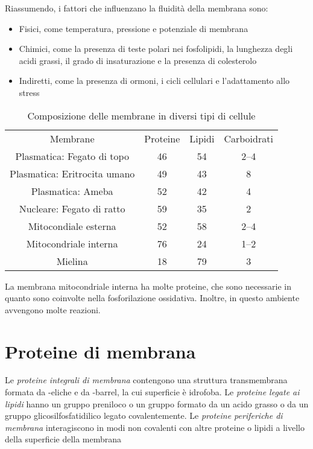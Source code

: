 Riassumendo, i fattori che influenzano la fluidità della membrana sono:
\begin{itemize}
\item Fisici, come temperatura, pressione e potenziale di membrana
\item Chimici, come la presenza di teste polari nei fosfolipidi, la lunghezza degli acidi grassi, il grado di insaturazione e la presenza di colesterolo
\item Indiretti, come la presenza di ormoni, i cicli cellulari e l'adattamento allo stress
\end{itemize}

\begin{table}
\begin{tabular}{cccc}
Membrane & Proteine & Lipidi & Carboidrati \\
Plasmatica: Fegato di topo & 46 & 54 & 2--4\\
Plasmatica: Eritrocita umano & 49 & 43 & 8\\
Plasmatica: Ameba & 52 & 42 & 4\\
Nucleare: Fegato di ratto & 59 & 35 & 2\\
Mitocondiale esterna & 52 & 58 & 2--4\\
Mitocondriale interna & 76 & 24 & 1--2\\
Mielina & 18 & 79 & 3\\
\end{tabular}
\caption{Composizione delle membrane in diversi tipi di cellule}
\end{table}

La membrana mitocondriale interna ha molte proteine, che sono necessarie in quanto sono coinvolte nella fosforilazione ossidativa. Inoltre, in questo ambiente avvengono molte reazioni.


\clearpage

\section{Proteine di membrana}


Le \emph{proteine integrali di membrana} contengono una struttura transmembrana formata da \alpha-eliche e da \beta-barrel, la cui superficie è idrofoba.
Le \emph{proteine legate ai lipidi} hanno un gruppo preniloco o un gruppo formato da un acido grasso o da un gruppo glicosilfosfatidilico legato covalentemente.
Le \emph{proteine periferiche di membrana} interagiscono in modi non covalenti con altre proteine o lipidi a livello della superficie della membrana

